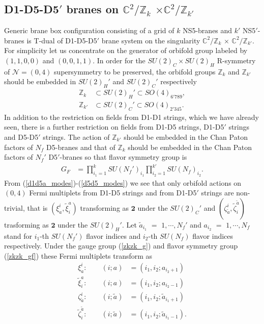 \documentclass{article}
\numberwithin{equation}{section}
\begin{document}
\subsection{D1-D5-D5$'$ branes on $\mathbb{C}^{2}/\mathbb{Z}_{k}$ $\times \mathbb{C}^{2}/\mathbb{Z}_{k'}$}
\label{sec_d1d5d5zkzk}
Generic brane box configuration 
consisting of a grid of $k$ NS5-branes and $k'$ NS5$'$-branes 
is T-dual of D1-D5-D5$'$ brane system on the singularity 
$\mathbb{C}^{2}/\mathbb{Z}_{k}$ $\times$ $\mathbb{C}^{2}/\mathbb{Z}_{k'}$. 
For simplicity let us concentrate on the generator of orbifold group labeled by $(1,1,0,0)$ and $(0,0,1,1)$. 
In order for the $SU(2)_{C}\times SU(2)_{H}$ R-symmetry of $\mathcal{N}=(0,4)$ supersymmetry to be preserved, 
the orbifold groups $\mathbb{Z}_{k}$ and $\mathbb{Z}_{k'}$ should be embedded 
in $SU(2)_{H}'$ and $SU(2)_{C}'$ respectively
\begin{align}
\label{emb_orb}
\mathbb{Z}_{k}&\subset SU(2)_{H}'\subset SO(4)_{6'789},\nonumber\\
\mathbb{Z}_{k'}&\subset SU(2)_{C}'\subset SO(4)_{2'345}. 
\end{align}
In addition to the restriction on fields from D1-D1 strings, which we have already seen, 
there is a further restriction on fields from 
D1-D5 strings, D1-D5$'$ strings and D5-D5$'$ strings. 
The action of $\mathbb{Z}_{k'}$ should be embedded in the Chan Paton factors of $N_{f}$ D5-branes 
and that of $\mathbb{Z}_{k}$ should be embedded in the Chan Paton factors of $N_{f}'$ D5$'$-branes 
so that flavor symmetry group is 
\begin{align}
\label{zkzk_gf}
G_{F}&=\prod_{i_{1}=1}^{k}SU(N_{f}')_{i_{1}}\prod_{i_{2}=1}^{k'}SU(N_{f})_{i_{2}}. 
\end{align}
From (\ref{d1d5a_modes})-(\ref{d5d5_modes}) 
we see that only orbifold actions on $(0,4)$ Fermi multiplets from D1-D5 strings and from D1-D5$'$ strings are non-trivial, 
that is $(\xi^{i}_{a}, \widetilde{\xi}^{a}_{i})$ transforming as $\bm{2}$ under the $SU(2)_{C}'$ and 
$(\zeta^{i}_{\tilde{a}},\widetilde{\zeta}^{\tilde{a}}_{i})$ trasforming as $\bm{2}$ under the $SU(2)_{H}'$. 
Let $\tilde{a}_{i_{1}}$ $=$ $1,\cdots, N_{f}'$ and 
$a_{i_{2}}$ $=$ $1,\cdots, N_{f}$ stand for $i_{1}$-th $SU(N_{f}')$ flavor indices 
and $i_{2}$-th $SU(N_{f})$ flavor indices respectively. 
Under the gauge group (\ref{zkzk_g}) and flavor symmetry group (\ref{zkzk_gf}) 
these Fermi multiplets transform as 
\begin{align}
\label{fm_d1d5zk}
\xi_{a}^{i}: \qquad (i;a)&=(i_{1}, i_{2};  a_{i_{2}+1}) \nonumber\\
\widetilde{\xi}^{a}_{i}: \qquad (i;a)&=(i_{1}, i_{2}; a_{i_{2}-1})  \nonumber\\
\zeta_{\tilde{a}}^{i}: \qquad (i;\tilde{a})&=(i_{1}, i_{2}; \widetilde{a}_{i_{1}+1}) \nonumber\\
\widetilde{\zeta}^{\tilde{a}}_{i}: \qquad (i;\tilde{a})&=(i_{1}, i_{2}; \widetilde{a}_{i_{1}-1}). 
\end{align}
\end{document}
